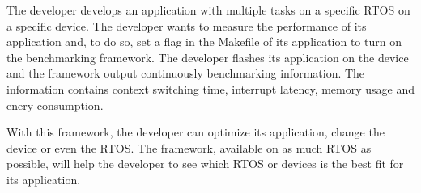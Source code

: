 The developer develops an application with multiple tasks on a specific RTOS on a specific device.
The developer wants to measure the performance of its application and, to do so, set a flag in the Makefile of its application to turn on the benchmarking framework.
The developer flashes its application on the device and the framework output continuously benchmarking information.
The information contains context switching time, interrupt latency, memory usage and enery consumption.

With this framework, the developer can optimize its application, change the device or even the RTOS.
The framework, available on as much RTOS as possible, will help the developer to see which RTOS or devices is the best fit for its application.